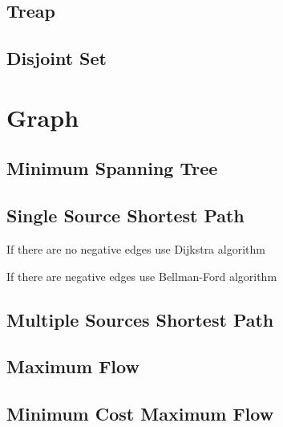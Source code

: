\documentclass[a4paper,11pt]{article}
\begin{document}
  \subsection{Treap}
    
  
  \subsection{Disjoint Set}
        

\section{Graph}
  \subsection{Minimum Spanning Tree}
    

  \subsection{Single Source Shortest Path}
    If there are no negative edges use Dijkstra algorithm
        
    
    If there are negative edges use Bellman-Ford algorithm
    

  \subsection{Multiple Sources Shortest Path}
    
  
  \subsection{Maximum Flow}
    
  
  \subsection{Minimum Cost Maximum Flow}
    
  
\end{document}
